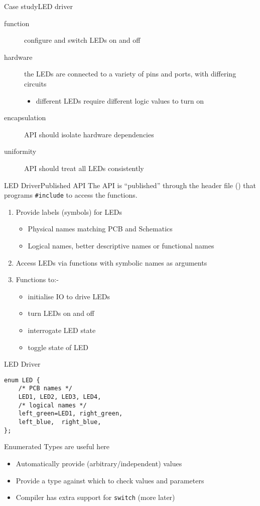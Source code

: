 \documentclass[svgnames,x11names]{beamer}
\begin{document}
\begin{frame}{Case study}{LED driver}
  \begin{description}
  \item[function] configure and switch LEDs on and off
  \item[hardware] the LEDs are connected to a variety of pins and
    ports, with differing circuits 
    \begin{itemize}
    \item different LEDs require different logic values to turn on
    \end{itemize}
  \item[encapsulation] API should isolate hardware dependencies
  \item[uniformity] API should treat all LEDs consistently 
  \end{description}
\end{frame}

\begin{frame}{LED Driver}{Published API}
  The API is ``published'' through the header file () that
  programs \texttt{\#include} to access the functions.
  \begin{enumerate}
  \item Provide labels (symbols) for LEDs
    \begin{itemize}
    \item Physical names matching PCB and Schematics
    \item Logical names, better descriptive names or functional names
    \end{itemize}
  \item Access LEDs via functions with symbolic names as arguments
  \item Functions to:-
    \begin{itemize}
    \item initialise IO to drive LEDs
    \item turn LEDs on and off
    \item interrogate LED state
    \item toggle state of LED
    \end{itemize}

  \end{enumerate}
\end{frame}

\begin{frame}[fragile]{LED Driver}{}
\begin{verbatim}
enum LED {
	/* PCB names */
	LED1, LED2, LED3, LED4,
	/* logical names */
	left_green=LED1, right_green,
	left_blue,	right_blue,
};
\end{verbatim}

\alert{Enumerated Types} are useful here
\begin{itemize}
\item Automatically provide (arbitrary/independent) values
\item Provide a type against which to check values and parameters
\item Compiler has extra support for \texttt{switch} (more later)
\end{itemize}

\end{frame}
\end{document}
